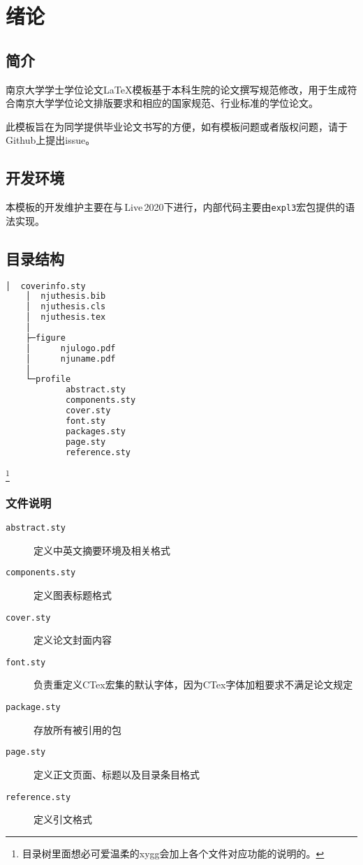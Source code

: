 \chapter{绪论}

\section{简介}
南京大学学士学位论文\LaTeX 模板\cite{njuthesis}基于本科生院的论文撰写规范修改，用于生成符合南京大学学位论文排版要求和相应的国家规范、行业标准的学位论文。

此模板旨在为同学提供毕业论文书写的方便，如有模板问题或者版权问题，请于Github上提出issue。

\section{开发环境}

本模板的开发维护主要在与\,Live\,2020下进行，内部代码主要由\lstinline|expl3|宏包提供的语法实现。

\section{目录结构}
\label{sec:directory}

\begin{lstlisting}[language=bash]
    │  coverinfo.sty
    │  njuthesis.bib
    │  njuthesis.cls
    │  njuthesis.tex
    │
    ├─figure
    │      njulogo.pdf
    │      njuname.pdf
    │
    └─profile
            abstract.sty
            components.sty
            cover.sty
            font.sty
            packages.sty
            page.sty
            reference.sty
\end{lstlisting}

\footnote{目录树里面想必可爱温柔的xygg会加上各个文件对应功能的说明的。}

\subsection{文件说明}
\begin{description}
    \item [\texttt{abstract.sty}] 定义中英文摘要环境及相关格式
    \item [\texttt{components.sty}] 定义图表标题格式
    \item [\texttt{cover.sty}] 定义论文封面内容
    \item [\texttt{font.sty}] 负责重定义CTex宏集的默认字体，因为CTex字体加粗要求不满足论文规定
    \item [\texttt{package.sty}] 存放所有被引用的包
    \item [\texttt{page.sty}] 定义正文页面、标题以及目录条目格式
    \item [\texttt{reference.sty}] 定义引文格式
\end{description}

